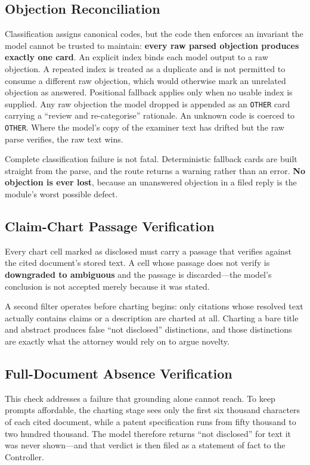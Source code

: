 \documentclass[conference]{IEEEtran}
\newcommand{\code}[1]{\texttt{\small #1}}
\begin{document}
\subsection{Objection Reconciliation}

Classification assigns canonical codes, but the code then enforces an invariant the model cannot be trusted to maintain: \textbf{every raw parsed objection produces exactly one card}. An explicit index binds each model output to a raw objection. A repeated index is treated as a duplicate and is not permitted to consume a different raw objection, which would otherwise mark an unrelated objection as answered. Positional fallback applies only when no usable index is supplied. Any raw objection the model dropped is appended as an \code{OTHER} card carrying a ``review and re-categorise'' rationale. An unknown code is coerced to \code{OTHER}. Where the model's copy of the examiner text has drifted but the raw parse verifies, the raw text wins.

Complete classification failure is not fatal. Deterministic fallback cards are built straight from the parse, and the route returns a warning rather than an error. \textbf{No objection is ever lost}, because an unanswered objection in a filed reply is the module's worst possible defect.

\subsection{Claim-Chart Passage Verification}

Every chart cell marked as disclosed must carry a passage that verifies against the cited document's stored text. A cell whose passage does not verify is \textbf{downgraded to ambiguous} and the passage is discarded---the model's conclusion is not accepted merely because it was stated.

A second filter operates before charting begins: only citations whose resolved text actually contains claims or a description are charted at all. Charting a bare title and abstract produces false ``not disclosed'' distinctions, and those distinctions are exactly what the attorney would rely on to argue novelty.

\subsection{Full-Document Absence Verification}

This check addresses a failure that grounding alone cannot reach. To keep prompts affordable, the charting stage sees only the first six thousand characters of each cited document, while a patent specification runs from fifty thousand to two hundred thousand. The model therefore returns ``not disclosed'' for text it was never shown---and that verdict is then filed as a statement of fact to the Controller.
\end{document}

